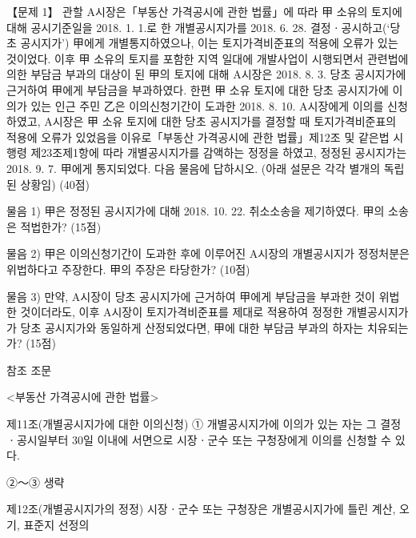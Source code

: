 \begin{longquestion}{【문제 1】}
관할 A시장은「부동산 가격공시에 관한 법률」에 따라 甲 소유의 토지에 대해 공시기준일을 2018. 1. 1.로 한 개별공시지가를 2018. 6. 28. 결정ㆍ공시하고(‘당초 공시지가’) 甲에게 개별통지하였으나, 이는 토지가격비준표의 적용에 오류가 있는 것이었다. 이후 甲 소유의 토지를 포함한 지역 일대에 개발사업이 시행되면서 관련법에 의한 부담금 부과의 대상이 된 甲의 토지에 대해 A시장은 2018. 8. 3. 당초 공시지가에 근거하여 甲에게 부담금을 부과하였다. 한편 甲 소유 토지에 대한 당초 공시지가에 이의가 있는 인근 주민 乙은 이의신청기간이 도과한 2018. 8. 10. A시장에게 이의를 신청하였고, A시장은 甲 소유 토지에 대한 당초 공시지가를 결정할 때 토지가격비준표의 적용에 오류가 있었음을 이유로「부동산 가격공시에 관한 법률」제12조 및 같은법 시행령 제23조제1항에 따라 개별공시지가를 감액하는 정정을 하였고, 정정된 공시지가는 2018. 9. 7. 甲에게 통지되었다. 다음 물음에 답하시오. (아래 설문은 각각 별개의 독립된 상황임) (40점) \par
\medskip\noindent 물음 1) 甲은 정정된 공시지가에 대해 2018. 10. 22. 취소소송을 제기하였다. 甲의 소송은 적법한가? (15점) \par
\medskip\noindent 물음 2) 甲은 이의신청기간이 도과한 후에 이루어진 A시장의 개별공시지가 정정처분은 위법하다고 주장한다. 甲의 주장은 타당한가? (10점) \par
\medskip\noindent 물음 3) 만약, A시장이 당초 공시지가에 근거하여 甲에게 부담금을 부과한 것이 위법한 것이더라도, 이후 A시장이 토지가격비준표를 제대로 적용하여 정정한 개별공시지가가 당초 공시지가와 동일하게 산정되었다면, 甲에 대한 부담금 부과의 하자는 치유되는가? (15점) \par
\begin{framedtext}
참조 조문 \par
<부동산 가격공시에 관한 법률> \par
제11조(개별공시지가에 대한 이의신청) ① 개별공시지가에 이의가 있는 자는 그 결정ㆍ공시일부터 30일 이내에 서면으로 시장ㆍ군수 또는 구청장에게 이의를 신청할 수 있다. \par
②～③ 생략 \par
제12조(개별공시지가의 정정) 시장ㆍ군수 또는 구청장은 개별공시지가에 틀린 계산, 오기, 표준지 선정의 \par

\end{framedtext}
\end{longquestion}
